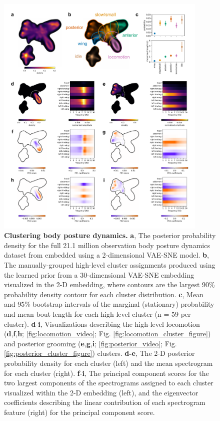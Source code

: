 \documentclass[11pt,a4paper,oneside]{book}
\begin{document}
\begin{figure}[!htb]
\includegraphics[width=0.9\textwidth]{Graving_IMPRS_Thesis/figures/cluster_figure.pdf}
\centering

\caption{  \textbf{Clustering body posture dynamics.} \textbf{a}, The posterior probability density for the full 21.1 million observation body posture dynamics dataset from \cite{berman2014mapping, berman2016predictability, pereira2019fast} embedded using a 2-dimensional VAE-SNE model. \textbf{b}, The manually-grouped high-level cluster assignments produced using the learned prior from a 30-dimensional VAE-SNE embedding visualized in the 2-D embedding, where contours are the largest 90\% probability density contour for each cluster distribution. \textbf{c}, Mean and 95\% bootstrap intervals of the marginal (stationary) probability and mean bout length for each high-level cluster (n = 59 per cluster). \textbf{d}-\textbf{i}, Visualizations describing the high-level locomotion (\textbf{d},\textbf{f},\textbf{h}; \ref{fig:locomotion_video}; Fig. \ref{fig:locomotion_cluster_figure}) and posterior grooming (\textbf{e},\textbf{g},\textbf{i}; \ref{fig:posterior_video}; Fig. \ref{fig:posterior_cluster_figure}) clusters. \textbf{d-e}, The 2-D posterior probability density for each cluster (left) and the mean spectrogram for each cluster (right). \textbf{f}-\textbf{i}, The principal component scores for the two largest components of the spectrograms assigned to each cluster visualized within the 2-D embedding (left), and the eigenvector coefficients describing the linear contribution of each spectrogram feature (right) for the principal component score.}
\label{fig:cluster_figure}
\end{figure}
\end{document}

